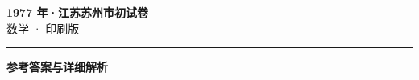 \documentclass[zihao=5, a4paper]{ctexart}
\begin{document}
\begin{center}
  {\Large\bfseries 1977 年·江苏苏州市初试卷}\\[4pt]
  {\large 数学 · 印刷版}
\end{center}
\medskip
{}

\par\bigskip\hrule\bigskip
{}
\begin{center}{\large\bfseries 参考答案与详细解析}\end{center}
\smallskip

\end{document}
